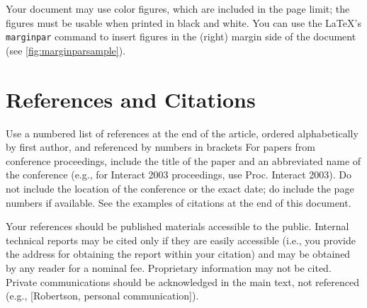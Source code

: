 \documentclass{chi-ext}
\begin{document}

Your document may use color figures, which are included in the page limit; the figures must be usable when printed in black and white.
You can use the \LaTeX's \texttt{marginpar} command to insert figures in the (right) margin side of the document (see \autoref{fig:marginparsample}).


\section{References and Citations}
Use a numbered list of references at the end of the article, ordered alphabetically by first author, and referenced by numbers in brackets \cite{Anderson92,Klemmer02,Mather00,Zellweger01}
For papers from conference proceedings, include the title of the paper and an abbreviated name of the conference (e.g., for Interact 2003 proceedings, use Proc. Interact 2003).
Do not include the location of the conference or the exact date; do include the page numbers if available.
See the examples of citations at the end of this document.

Your references should be published materials accessible to the public.
Internal technical reports may be cited only if they are easily accessible (i.e., you provide the address for obtaining the report within your citation) and may be obtained by any reader for a nominal fee.
Proprietary information may not be cited.
Private communications should be acknowledged in the main text, not referenced  (e.g., [Robertson, personal communication]).

\end{document}
